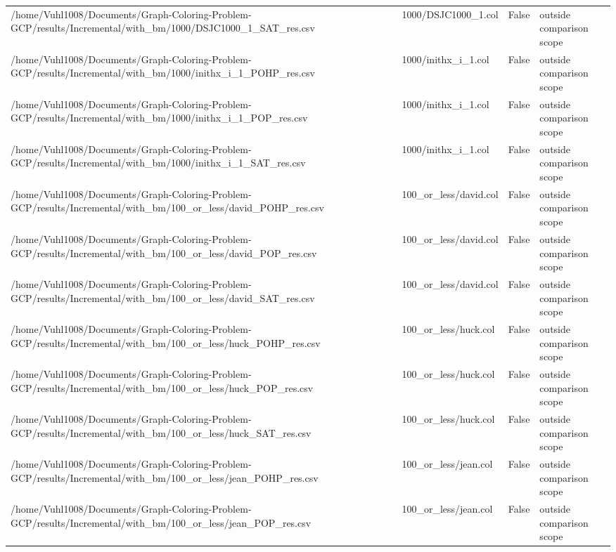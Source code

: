 \begin{table}[htbp]
\begin{tabular}{llll}
/home/Vuhl1008/Documents/Graph-Coloring-Problem-GCP/results/Incremental/with\_bm/1000/DSJC1000\_1\_SAT\_res.csv & 1000/DSJC1000\_1.col & False & outside comparison scope \\
/home/Vuhl1008/Documents/Graph-Coloring-Problem-GCP/results/Incremental/with\_bm/1000/inithx\_i\_1\_POHP\_res.csv & 1000/inithx\_i\_1.col & False & outside comparison scope \\
/home/Vuhl1008/Documents/Graph-Coloring-Problem-GCP/results/Incremental/with\_bm/1000/inithx\_i\_1\_POP\_res.csv & 1000/inithx\_i\_1.col & False & outside comparison scope \\
/home/Vuhl1008/Documents/Graph-Coloring-Problem-GCP/results/Incremental/with\_bm/1000/inithx\_i\_1\_SAT\_res.csv & 1000/inithx\_i\_1.col & False & outside comparison scope \\
/home/Vuhl1008/Documents/Graph-Coloring-Problem-GCP/results/Incremental/with\_bm/100\_or\_less/david\_POHP\_res.csv & 100\_or\_less/david.col & False & outside comparison scope \\
/home/Vuhl1008/Documents/Graph-Coloring-Problem-GCP/results/Incremental/with\_bm/100\_or\_less/david\_POP\_res.csv & 100\_or\_less/david.col & False & outside comparison scope \\
/home/Vuhl1008/Documents/Graph-Coloring-Problem-GCP/results/Incremental/with\_bm/100\_or\_less/david\_SAT\_res.csv & 100\_or\_less/david.col & False & outside comparison scope \\
/home/Vuhl1008/Documents/Graph-Coloring-Problem-GCP/results/Incremental/with\_bm/100\_or\_less/huck\_POHP\_res.csv & 100\_or\_less/huck.col & False & outside comparison scope \\
/home/Vuhl1008/Documents/Graph-Coloring-Problem-GCP/results/Incremental/with\_bm/100\_or\_less/huck\_POP\_res.csv & 100\_or\_less/huck.col & False & outside comparison scope \\
/home/Vuhl1008/Documents/Graph-Coloring-Problem-GCP/results/Incremental/with\_bm/100\_or\_less/huck\_SAT\_res.csv & 100\_or\_less/huck.col & False & outside comparison scope \\
/home/Vuhl1008/Documents/Graph-Coloring-Problem-GCP/results/Incremental/with\_bm/100\_or\_less/jean\_POHP\_res.csv & 100\_or\_less/jean.col & False & outside comparison scope \\
/home/Vuhl1008/Documents/Graph-Coloring-Problem-GCP/results/Incremental/with\_bm/100\_or\_less/jean\_POP\_res.csv & 100\_or\_less/jean.col & False & outside comparison scope \\

\end{tabular}
\end{table}
